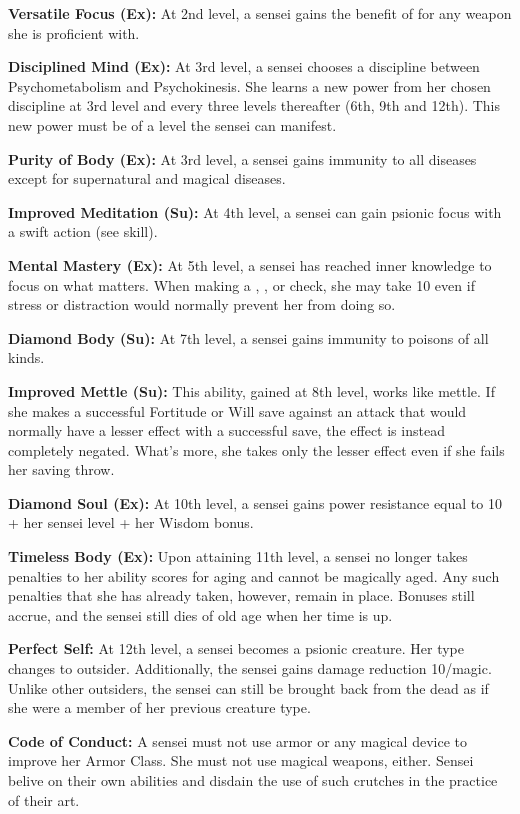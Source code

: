 {\textbf{Versatile Focus (Ex):} At 2nd level, a sensei gains the benefit of  for any weapon she is proficient with.

\textbf{Disciplined Mind (Ex):} At 3rd level, a sensei chooses a discipline between Psychometabolism and Psychokinesis. She learns a new power from her chosen discipline at 3rd level and every three levels thereafter (6th, 9th and 12th). This new power must be of a level the sensei can manifest.

\textbf{Purity of Body (Ex):} At 3rd level, a sensei gains immunity to all diseases except for supernatural and magical diseases.

\textbf{Improved Meditation (Su):} At 4th level, a sensei can gain psionic focus with a swift action (see  skill).

\textbf{Mental Mastery (Ex):} At 5th level, a sensei has reached inner knowledge to focus on what matters. When making a , , or  check, she may take 10 even if stress or distraction would normally prevent her from doing so.

\textbf{Diamond Body (Su):} At 7th level, a sensei gains immunity to poisons of all kinds.

\textbf{Improved Mettle (Su):} This ability, gained at 8th level, works like mettle. If she makes a successful Fortitude or Will save against an attack that would normally have a lesser effect with a successful save, the effect is instead completely negated. What's more, she takes only the lesser effect even if she fails her saving throw.

\textbf{Diamond Soul (Ex):} At 10th level, a sensei gains power resistance equal to 10 + her sensei level + her Wisdom bonus.

\textbf{Timeless Body (Ex):} Upon attaining 11th level, a sensei no longer takes penalties to her ability scores for aging and cannot be magically aged. Any such penalties that she has already taken, however, remain in place. Bonuses still accrue, and the sensei still dies of old age when her time is up.

\textbf{Perfect Self:} At 12th level, a sensei becomes a psionic creature. Her type changes to outsider. Additionally, the sensei gains damage reduction 10/magic. Unlike other outsiders, the sensei can still be brought back from the dead as if she were a member of her previous creature type.

\textbf{Code of Conduct:} A sensei must not use armor or any magical device to improve her Armor Class. She must not use magical weapons, either. Sensei belive on their own abilities and disdain the use of such crutches in the practice of their art.

}
